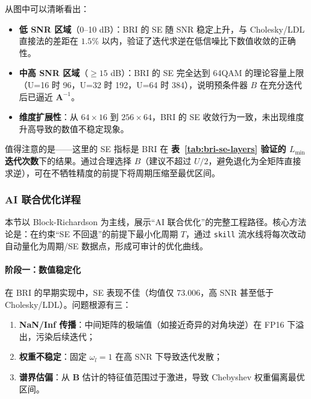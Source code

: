 \documentclass{CjC}
\begin{document}
    从图中可以清晰看出：
    \begin{itemize}
        \item \textbf{低 SNR 区域}（0--10 dB）：BRI 的 SE 随 SNR 稳定上升，与
            Cholesky/LDL 直接法的差距在 $1.5\%$
            以内，验证了迭代求逆在低信噪比下数值收敛的正确性。

        \item \textbf{中高 SNR 区域}（$\ge15$ dB）：BRI 的 SE 完全达到 64QAM
            的理论容量上限（U=16 时 96，U=32 时 192，U=64 时 384），说明预条件器
            $B$ 在充分迭代后已逼近 $\bm{A}^{-1}$。

        \item \textbf{维度扩展性}：从 $64\times16$ 到 $256\times64$，BRI 的 SE
            收敛行为一致，未出现维度升高导致的数值不稳定现象。
    \end{itemize}

    值得注意的是——这里的 SE 指标是 BRI 在 \textbf{表~\ref{tab:bri-se-layers}
    验证的 $L_{\min}$ 迭代次数}下的结果。通过合理选择 $B$（建议不超过 $U/2$，避免退化为全矩阵直接求逆），可在不牺牲精度的前提下将周期压缩至最优区间。

    \subsubsection{AI 联合优化详程}
    \label{sec:ai-opt}

    本节以 Block-Richardson 为主线，展示“AI 联合优化”的完整工程路径。核心方法论是：在约束“SE
    不回退”的前提下最小化周期 $T$，通过 \texttt{skill} 流水线将每次改动自动量化为周期/SE
    数据点，形成可审计的优化曲线。

    \paragraph{阶段一：数值稳定化}

    在 BRI 的早期实现中，SE 表现不佳（均值仅 73.006，高 SNR 甚至低于 Cholesky/LDL）。问题根源有三：
    \begin{enumerate}
        \item \textbf{NaN/Inf 传播}：中间矩阵的极端值（如接近奇异的对角块逆）在 FP16
            下溢出，污染后续迭代；

        \item \textbf{权重不稳定}：固定 $\omega_{l}=1$ 在高 SNR 下导致迭代发散；

        \item \textbf{谱界估偏}：从 $\bm{B}$ 估计的特征值范围过于激进，导致 Chebyshev
            权重偏离最优区间。
    \end{enumerate}
\end{document}
